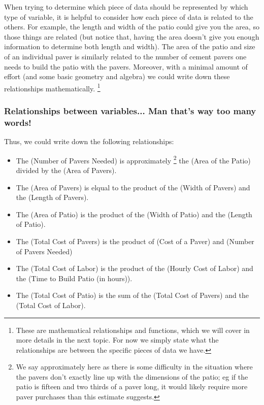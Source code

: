 When trying to determine which piece of data should be represented by which type of variable, it is helpful to consider how each piece of data is related to the others. For example, the length and width of the patio could give you the area, so those things are related (but notice that, having the area doesn't give you enough information to determine both length and width). The area of the patio and size of an individual paver is similarly related to the number of cement pavers one needs to build the patio with the pavers. Moreover, with a minimal amount of effort (and some basic geometry and algebra) we could write down these relationships mathematically.
\footnote{These are mathematical relationships and functions, which we will cover in more details in the next topic. For now we simply state what the relationships are between the specific pieces of data we have.}
\subsubsection*{Relationships between variables... Man that's way too many words!}
Thus, we could write down the following relationships:
\begin{itemize}
\item The (Number of Pavers Needed) is approximately%
\footnote{We say approximately here as there is some difficulty in the situation where the pavers don't exactly line up with the dimensions of the patio; eg if the patio is fifteen and two thirds of a paver long, it would likely require more paver purchases than this estimate suggests.}
the (Area of the Patio) divided by the (Area of Pavers).
\item The (Area of Pavers) is elqual to the product of the (Width of Pavers) and the (Length of Pavers).
\item The (Area of Patio) is the product of the (Width of Patio) and the (Length of Patio).
\item The (Total Cost of Pavers) is the product of (Cost of a Paver) and (Number of Pavers Needed)
\item The (Total Cost of Labor) is the product of the (Hourly Cost of Labor) and the (Time to Build Patio (in hours)).
\item The (Total Cost of Patio) is the sum of the (Total Cost of Pavers) and the (Total Cost of Labor).
\end{itemize}


